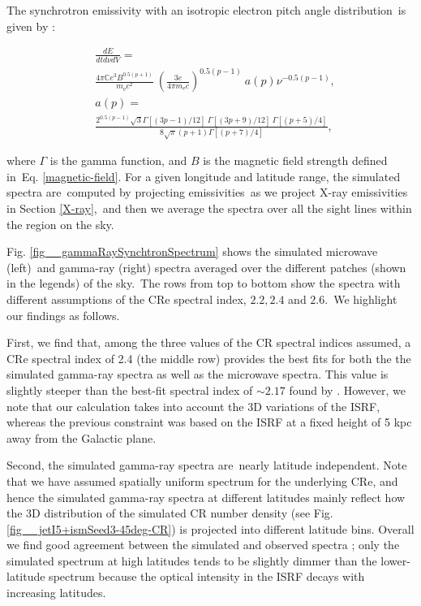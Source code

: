 \documentclass[fleqn,usenatbib,useAMS]{mnras}
\begin{document}
The synchrotron emissivity with an isotropic electron pitch angle distribution\
is given by \citet{BLUMENTHAL1970}:

\begin{subequations}
   \begin{align}
      &\frac{dE}{dtd\nu dV} =\nonumber\\
      &\frac{4\pi\mathbb{C}e^{3}B^{0.5(p+1)}}{m_{\text{e}}c^{2}}\
      \left(\frac{3e}{4\pi m_{\text{e}}c}\right)^{0.5(p-1)}\
      a(p)\nu^{-0.5(p-1)},\\
      &a(p)=\nonumber\\
           &\frac{2^{0.5(p-1)}\sqrt{3}\Gamma\left[\left(3p-1\right)/12\right]\
                                      \Gamma\left[\left(3p+9\right)/12\right]\
                                      \Gamma\left[\left(p+5\right)/4\right]}
      {8\sqrt{\pi}(p+1)\Gamma\left[\left(p+7\right)/4\right]},
   \end{align}
   \label{synchrotron-emissivity}
\end{subequations}

where $\Gamma$ is the gamma function, and $B$ is the magnetic field strength defined in\
Eq. \ref{magnetic-field}. For a given longitude and latitude range, the simulated spectra are\
computed by projecting emissivities\
as we project X-ray emissivities in Section \ref{X-ray},\
and then we average the spectra over all the sight lines within the region on the sky.


Fig. \ref{fig__gammaRaySynchtronSpectrum} shows the simulated microwave (left)\
and gamma-ray (right) spectra averaged over the different patches (shown in the legends) of the sky.\
The rows from top to bottom show the spectra with different assumptions of the CRe spectral index, $2.2, 2.4$ and $2.6$.\
We highlight our findings as follows.\

First, we find that, among the three values of the CR spectral indices assumed, a CRe spectral index of 2.4 (the middle row) provides the best fits for both the the simulated gamma-ray spectra as well as the microwave spectra. This value is slightly steeper than the best-fit spectral index of $\sim 2.17$ found by \cite{Ackermann2014}. However, we note that our calculation takes into account the 3D variations of the ISRF, whereas the previous constraint was based on the ISRF at a fixed height of 5 kpc away from the Galactic plane.

Second, the simulated gamma-ray spectra are\
nearly latitude independent. Note that we have assumed spatially uniform spectrum for the underlying CRe, and hence the simulated gamma-ray spectra at different latitudes mainly reflect how the 3D distribution of the simulated CR number density (see Fig. \ref{fig__jetI5+ismSeed3-45deg-CR})  is projected into different latitude bins. Overall we find good agreement between the simulated and observed spectra \citep{Ackermann2014}; only the simulated spectrum at high latitudes tends to be slightly dimmer than the lower-latitude spectrum because the optical intensity in the ISRF decays with increasing latitudes.
\end{document}
